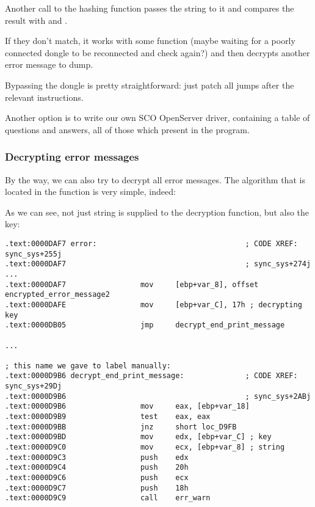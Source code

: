 Another call to the  hashing function passes the
 string to it and compares the result with
 and .

If they don't match, it works with some  
function (maybe waiting for a poorly
connected dongle to be reconnected and check again?) and then decrypts another error message to dump.



Bypassing the dongle is pretty straightforward: just patch all jumps after the relevant \CMP instructions.

Another option is to write our own SCO OpenServer driver, containing a table of questions and answers, all of those which present in the program.

\subsubsection{Decrypting error messages}

By the way, we can also try to decrypt all error messages.
The algorithm that is located in the  function is very simple, indeed:



As we can see, 
not just string is supplied to the decryption function, but also the key:

\begin{lstlisting}
.text:0000DAF7 error:                                  ; CODE XREF: sync_sys+255j
.text:0000DAF7                                         ; sync_sys+274j ...
.text:0000DAF7                 mov     [ebp+var_8], offset encrypted_error_message2
.text:0000DAFE                 mov     [ebp+var_C], 17h ; decrypting key
.text:0000DB05                 jmp     decrypt_end_print_message

...

; this name we gave to label manually:
.text:0000D9B6 decrypt_end_print_message:              ; CODE XREF: sync_sys+29Dj
.text:0000D9B6                                         ; sync_sys+2ABj
.text:0000D9B6                 mov     eax, [ebp+var_18]
.text:0000D9B9                 test    eax, eax
.text:0000D9BB                 jnz     short loc_D9FB
.text:0000D9BD                 mov     edx, [ebp+var_C] ; key
.text:0000D9C0                 mov     ecx, [ebp+var_8] ; string
.text:0000D9C3                 push    edx
.text:0000D9C4                 push    20h
.text:0000D9C6                 push    ecx
.text:0000D9C7                 push    18h
.text:0000D9C9                 call    err_warn
\end{lstlisting}

